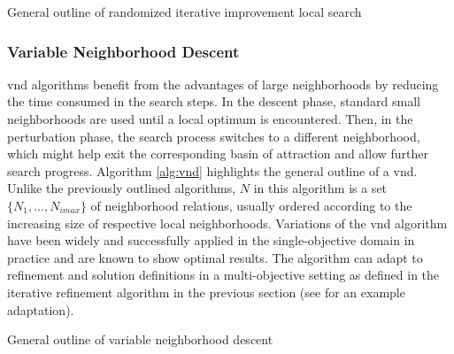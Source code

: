  \begin{algorithm}
  \caption{General outline of randomized iterative improvement local search}\label{alg:randomized-iterative-improvement}
  \end{algorithm}



\subsubsection{Variable Neighborhood Descent}
\Gls{vnd} algorithms benefit from the advantages of large neighborhoods by reducing the time consumed in the search steps. In the descent phase, standard small neighborhoods are used until a local optimum is encountered. Then, in the perturbation phase, the search process switches to a different neighborhood, which might help exit the corresponding basin of attraction and allow further search progress. Algorithm \ref{alg:vnd} highlights the general outline of a \gls{vnd}. Unlike the previously outlined algorithms, $N$ in this algorithm is a set $\{N_1,..., N_{imax}\}$ of neighborhood relations, usually ordered according to the increasing size of respective local neighborhoods. Variations of the \gls{vnd} algorithm have been widely and successfully applied in the single-objective domain in practice and are known to show optimal results. The algorithm can adapt to refinement and solution definitions in a multi-objective setting as defined in the iterative refinement algorithm in the previous section (see \parencite{Duarte2015Multi-objectiveProblems} for an example adaptation).

\begin{algorithm}
  \caption{General outline of variable neighborhood descent}\label{alg:vnd}
  \end{algorithm}


